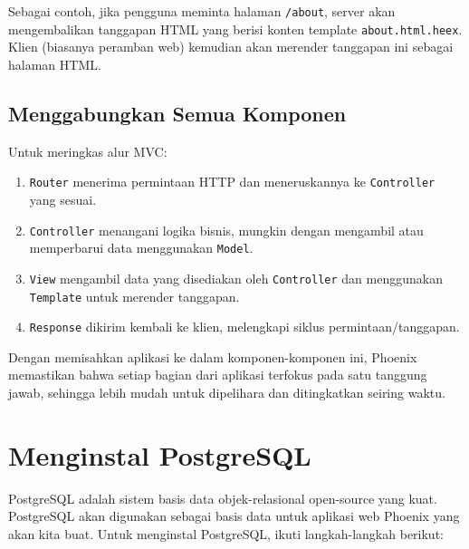 Sebagai contoh, jika pengguna meminta halaman \texttt{/about}, server akan mengembalikan tanggapan HTML yang berisi konten template \texttt{about.html.heex}. Klien (biasanya peramban web) kemudian akan merender tanggapan ini sebagai halaman HTML.

\subsection{Menggabungkan Semua Komponen}
Untuk meringkas alur MVC:
\begin{enumerate}
	\item \texttt{Router} menerima permintaan HTTP dan meneruskannya ke \texttt{Controller} yang sesuai.
	\item \texttt{Controller} menangani logika bisnis, mungkin dengan mengambil atau memperbarui data menggunakan \texttt{Model}.
	\item \texttt{View} mengambil data yang disediakan oleh \texttt{Controller} dan menggunakan \texttt{Template} untuk merender tanggapan.
	\item \texttt{Response} dikirim kembali ke klien, melengkapi siklus permintaan/tanggapan.
\end{enumerate}

Dengan memisahkan aplikasi ke dalam komponen-komponen ini, Phoenix memastikan bahwa setiap bagian dari aplikasi terfokus pada satu tanggung jawab, sehingga lebih mudah untuk dipelihara dan ditingkatkan seiring waktu.


\section{Menginstal PostgreSQL}
PostgreSQL adalah sistem basis data objek-relasional open-source yang kuat. PostgreSQL akan digunakan sebagai basis data untuk aplikasi web Phoenix yang akan kita buat. Untuk menginstal PostgreSQL, ikuti langkah-langkah berikut:

